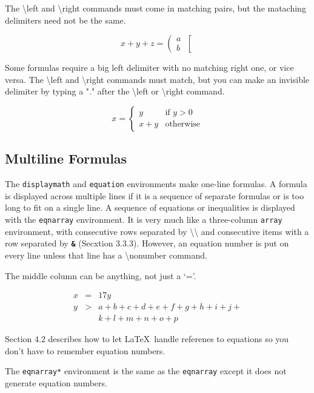 \documentclass[twocolumn]{book}        %
\begin{document}
The \textbackslash left and \textbackslash right commands must come in matching pairs, but the mataching
delimiters need not be the same.

\[ x + y + z = \left( \begin{array}{c}
    a \\ b 
\end{array}     \right[ \]

Some formulas require a big left delimiter with no matching right one, or vice versa. 
The \textbackslash left and \textbackslash right commands must match, but you can make an 
invisible delimiter by typing a "." after the \textbackslash left or \textbackslash right
command.

\[ x = \left\{ \begin{array}{ll} 
    y & \mbox{if $y>0$} \\
    x+y & \mbox{otherwise} 
\end{array}
\right. \]

\subsection{Multiline Formulas}

The \texttt{displaymath} and \texttt{equation} environments make one-line formulas. 
A formula is displayed across multiple lines if it is a sequence of separate formulas
or is too long to fit on a single line. A sequence of equations or inequalities is 
displayed with the \texttt{eqnarray} environment. It is very much like a three-column 
\texttt{array} environment, with consecutive rows separated by \textbackslash \textbackslash 
and consecutive items with a row separated by \textbf{\texttt{\&}} (Secxtion 3.3.3). However, 
an equation number is put on every line unless that line has a \textbackslash nonumber command.

The middle column can be anything, not just a `='.

\begin{eqnarray}
    x & = & 17y \\
    y & > & a + b + c + d + e + f + g + h + i + j + \nonumber \\ 
      &   & k + l + m + n + o + p 
\end{eqnarray}

Section 4.2 describes how to let \LaTeX\ handle referenes to equations so you don't have to remember 
equation numbers.

The \texttt{eqnarray*} environment is the same as the \texttt{eqnarray} except it does not generate 
equation numbers.
\end{document}
